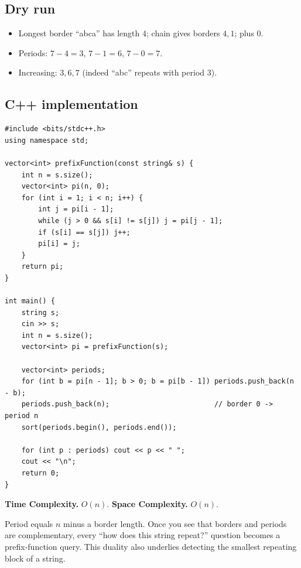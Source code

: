 \subsection*{Dry run}


\begin{itemize}
  \item Longest border ``abca'' has length $4$; chain gives borders
        $4,1$; plus $0$.
  \item Periods: $7-4=3$, $7-1=6$, $7-0=7$.
  \item Increasing: $3,6,7$ (indeed ``abc'' repeats with period $3$).
\end{itemize}

\subsection*{C++ implementation}

\begin{lstlisting}
#include <bits/stdc++.h>
using namespace std;

vector<int> prefixFunction(const string& s) {
    int n = s.size();
    vector<int> pi(n, 0);
    for (int i = 1; i < n; i++) {
        int j = pi[i - 1];
        while (j > 0 && s[i] != s[j]) j = pi[j - 1];
        if (s[i] == s[j]) j++;
        pi[i] = j;
    }
    return pi;
}

int main() {
    string s;
    cin >> s;
    int n = s.size();
    vector<int> pi = prefixFunction(s);

    vector<int> periods;
    for (int b = pi[n - 1]; b > 0; b = pi[b - 1]) periods.push_back(n - b);
    periods.push_back(n);                         // border 0 -> period n
    sort(periods.begin(), periods.end());

    for (int p : periods) cout << p << " ";
    cout << "\n";
    return 0;
}
\end{lstlisting}

\begin{complexitybox}
\textbf{Time Complexity.} $O(n)$. \textbf{Space Complexity.} $O(n)$.
\end{complexitybox}

\begin{takeawaybox}
Period equals $n$ minus a border length. Once you see that borders and
periods are complementary, every ``how does this string repeat?'' question
becomes a prefix-function query. This duality also underlies detecting the
smallest repeating block of a string.
\end{takeawaybox}
